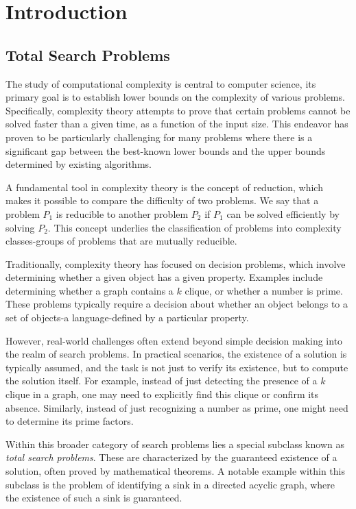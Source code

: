 \setchapterpreamble[u]{\margintoc}
\chapter{Introduction}

\section{Total Search Problems}

The study of computational complexity is central to computer science, its primary goal is to establish lower bounds on the complexity of various problems. Specifically, complexity theory attempts to prove that certain problems cannot be solved faster than a given time, as a function of the input size. This endeavor has proven to be particularly challenging for many problems where there is a significant gap between the best-known lower bounds and the upper bounds determined by existing algorithms.

A fundamental tool in complexity theory is the concept of reduction, which makes it possible to compare the difficulty of two problems. We say that a problem $P_1$ is reducible to another problem $P_2$ if $P_1$ can be solved efficiently by solving $P_2$. This concept underlies the classification of problems into complexity classes-groups of problems that are mutually reducible.

Traditionally, complexity theory has focused on decision problems, which involve determining whether a given object has a given property. Examples include determining whether a graph contains a $k$ clique, or whether a number is prime. These problems typically require a decision about whether an object belongs to a set of objects-a language-defined by a particular property.

However, real-world challenges often extend beyond simple decision making into the realm of search problems. In practical scenarios, the existence of a solution is typically assumed, and the task is not just to verify its existence, but to compute the solution itself. For example, instead of just detecting the presence of a $k$ clique in a graph, one may need to explicitly find this clique or confirm its absence. Similarly, instead of just recognizing a number as prime, one might need to determine its prime factors.

Within this broader category of search problems lies a special subclass known as \emph{total search problems}. These are characterized by the guaranteed existence of a solution, often proved by mathematical theorems. A notable example within this subclass is the problem of identifying a sink in a directed acyclic graph, where the existence of such a sink is guaranteed.

